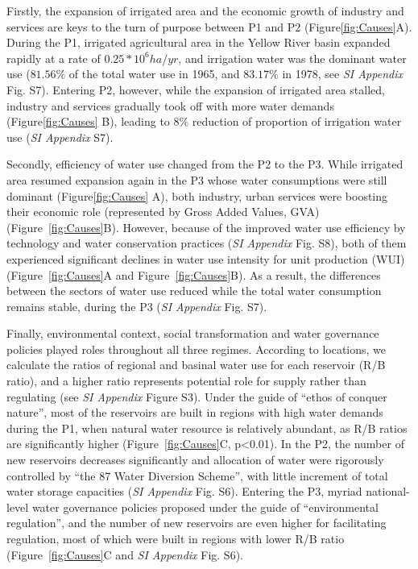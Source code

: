 \documentclass[9pt, twocolumn, twoside, lineno]{pnas-new}
\begin{document}
Firstly, the expansion of irrigated area and the economic growth of industry and services are keys to the turn of purpose between P1 and P2 (Figure\ref{fig:Causes}A). During the P1, irrigated agricultural area in the Yellow River basin expanded rapidly at a rate of $0.25*10^6 ha/yr$, and irrigation water was the dominant water use ($81.56\%$ of the total water use in 1965, and $83.17\%$ in 1978, see \textit{SI Appendix} Fig. S7). Entering P2, however, while the expansion of irrigated area stalled, industry and services gradually took off with more water demands (Figure\ref{fig:Causes} B), leading to $8\%$ reduction of proportion of irrigation water use (\textit{SI Appendix} S7).

Secondly, efficiency of water use changed from the P2 to the P3.
While irrigated area resumed expansion again in the P3 whose water consumptions were still dominant (Figure\ref{fig:Causes} A), both industry, urban services were boosting their economic role (represented by Gross Added Values, GVA) (Figure~\ref{fig:Causes}B). 
However, because of the improved water use efficiency by technology and water conservation practices (\textit{SI Appendix} Fig. S8), both of them experienced significant declines in water use intensity for unit production (WUI) (Figure~\ref{fig:Causes}A and Figure~\ref{fig:Causes}B). 
As a result, the differences between the sectors of water use reduced while the total water consumption remains stable, during the P3 (\textit{SI Appendix} Fig. S7).

Finally, environmental context, social transformation and water governance policies played roles throughout all three regimes. 
According to locations, we calculate the ratios of regional and basinal water use for each reservoir (R/B ratio), and a higher ratio represents potential role for supply rather than regulating (see \textit{SI Appendix} Figure S3).
Under the guide of ``ethos of conquer nature'', most of the reservoirs are built in regions with high water demands during the P1, when natural water resource is relatively abundant, as R/B ratios are significantly higher (Figure~\ref{fig:Causes}C, p<0.01). 
In the P2, the number of new reservoirs decreases significantly and allocation of water were rigorously controlled by ``the 87 Water Diversion Scheme'', with little increment of total water storage capacities (\textit{SI Appendix} Fig. S6). 
Entering the P3, myriad national-level water governance policies proposed under the guide of ``environmental regulation'', and the number of new reservoirs are even higher for facilitating regulation, most of which were built in regions with lower R/B ratio (Figure~\ref{fig:Causes}C and \textit{SI Appendix} Fig. S6).
\end{document}
